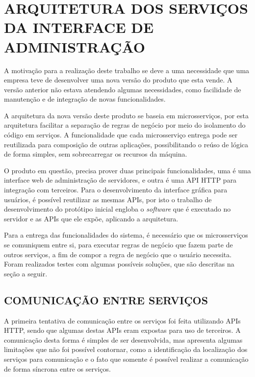 \chapter{ARQUITETURA DOS SERVIÇOS DA INTERFACE DE ADMINISTRAÇÃO}
\label{chp:arquitetura}

A motivação para a realização deste trabalho se deve a uma necessidade que uma
empresa teve de desenvolver uma nova versão do produto que esta vende. A
versão anterior não estava atendendo algumas necessidades, como facilidade
de manutenção e de integração de novas funcionalidades.

A arquitetura da nova versão deste produto se baseia em microsserviços,
por esta arquitetura facilitar a separação de regras de negócio por meio do
isolamento do código em serviços. A funcionalidade que cada microsserviço
entrega pode ser reutilizada para composição de outras aplicações,
possibilitando o reúso de lógica de forma simples, sem sobrecarregar
os recursos da máquina.

O produto em questão, precisa prover duas principais funcionalidades, uma
é uma interface web de administração de servidores, e outra é uma
\ac{API} \ac{HTTP} para integração com terceiros. Para o desenvolvimento da
interface gráfica para usuários, é possível reutilizar as mesmas \acp{API},
por isto o trabalho de desenvolvimento do protótipo inicial engloba o
\emph{software} que é executado no servidor e as \acp{API} que ele expõe,
aplicando a arquitetura.

Para a entrega das funcionalidades do sistema, é necessário que os microsserviços
se comuniquem entre si, para executar regras de negócio que fazem parte de outros
serviços, a fim de compor a regra de negócio que o usuário necessita. Foram
realizados testes com algumas possíveis soluções, que são descritas na seção
a seguir.

\section{COMUNICAÇÃO ENTRE SERVIÇOS}

A primeira tentativa de comunicação entre os serviços foi feita utilizando
\acp{API} \ac{HTTP}, sendo que algumas destas \acp{API} eram expostas para
uso de terceiros. A comunicação desta forma é simples de ser desenvolvida,
mas apresenta algumas limitações que não foi possível contornar, como a identificação
da localização dos serviços para comunicação e o fato que somente é possível
realizar a comunicação de forma síncrona entre os serviços.

